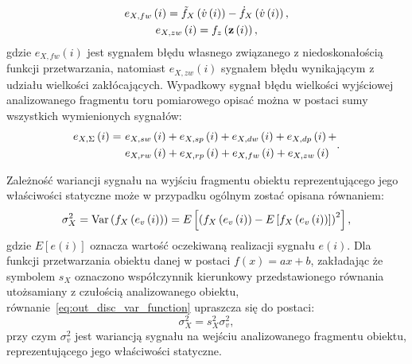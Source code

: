 \begin{gather}
e_{X,fw} \left(i\right) = \tilde{f}_{X} \left( \dot{v} \left(i\right) \right) - \dot{f}_{X} \left( \dot{v} \left(i\right) \right) \label{eq:out_disc_err_funct_self}, \\
e_{X,zw} \left(i\right) = f_{z} \left(\mathbf{z} \left(i\right)\right) \label{eq:out_disc_err_env_self},
\end{gather}
gdzie $e_{X,fw}(i)$ jest sygnałem błędu własnego związanego z niedoskonałością funkcji przetwarzania, natomiast $e_{X,zw}(i)$ sygnałem błędu wynikającym z udziału wielkości zakłócających. Wypadkowy sygnał błędu wielkości wyjściowej analizowanego fragmentu toru pomiarowego opisać można w postaci sumy wszystkich wymienionych sygnałów:
\begin{equation}
\begin{split}
e_{X,\Sigma} \left(i\right) =~
& e_{X,sw} \left(i\right) + e_{X,sp} \left(i\right) + e_{X,dw} \left(i\right) + e_{X,dp} \left(i\right) + \\
& e_{X,rw} \left(i\right) + e_{X,rp} \left(i\right) + e_{X,fw} \left(i\right) + e_{X,zw} \left(i\right)
\end{split}
\label{eq:out_disc_err_sum_all}.
\end{equation}

Zależność wariancji sygnału na wyjściu fragmentu obiektu reprezentującego jego właściwości statyczne może w przypadku ogólnym zostać opisana równaniem:
\begin{equation}
\sigma_{X}^{2} = \text{Var}\left(f_{X} \left(e_{v} \left(i\right)\right)\right) = E \left[ \left( f_{X} \left(e_{v} \left(i\right)\right) - E \left[ f_{X} \left(e_{v} \left(i\right)\right) \right] \right)^2 \right] \label{eq:out_disc_var_function},
\end{equation}
gdzie $E[e(i)]$ oznacza wartość oczekiwaną realizacji sygnału $e(i)$. Dla funkcji przetwarzania obiektu danej w postaci $f(x) = ax+b$, zakładając że symbolem $s_{X}$ oznaczono współczynnik kierunkowy przedstawionego równania utożsamiany z czułością analizowanego obiektu, równanie~\eqref{eq:out_disc_var_function} upraszcza się do postaci:
\begin{equation}
\sigma_{X}^{2} = s_{X}^{2} \sigma_{v}^{2} \label{eq:out_disc_var_sense},
\end{equation}
przy czym $\sigma_{v}^{2}$ jest wariancją sygnału na wejściu analizowanego fragmentu obiektu, reprezentującego jego właściwości statyczne.


